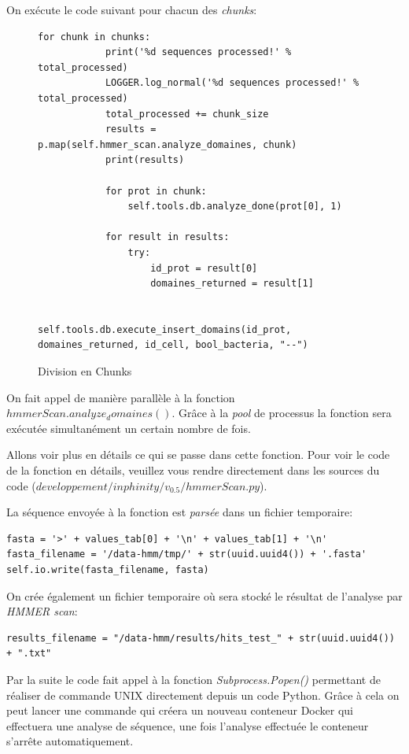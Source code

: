 On exécute le code suivant pour chacun des \emph{chunks}:

\begin{figure}[H] 
\centering 
\begin{lstlisting}[frame=single]
for chunk in chunks:
            print('%d sequences processed!' % total_processed)
            LOGGER.log_normal('%d sequences processed!' % total_processed)
            total_processed += chunk_size
            results = p.map(self.hmmer_scan.analyze_domaines, chunk)
            print(results)

            for prot in chunk:
                self.tools.db.analyze_done(prot[0], 1)

            for result in results:
                try:
                    id_prot = result[0]
                    domaines_returned = result[1]

                    self.tools.db.execute_insert_domains(id_prot, domaines_returned, id_cell, bool_bacteria, "--")
\end{lstlisting} 
\caption[Division en Chunks]{Division en Chunks}
\label{fig:chunks} 
\end{figure}

On fait appel de manière parallèle à la fonction \emph{$hmmerScan.analyze_domaines()$}. Grâce à la \emph{pool} de processus la fonction sera exécutée simultanément un certain nombre de fois.

Allons voir plus en détails ce qui se passe dans cette fonction. Pour voir le code de la fonction en détails, veuillez vous rendre directement dans les sources du code (\emph{$developpement/inphinity/v_0.5/hmmerScan.py$}).

La séquence envoyée à la fonction est \emph{parsée} dans un fichier temporaire:

\begin{lstlisting}[frame=single]
fasta = '>' + values_tab[0] + '\n' + values_tab[1] + '\n'
fasta_filename = '/data-hmm/tmp/' + str(uuid.uuid4()) + '.fasta'
self.io.write(fasta_filename, fasta)
\end{lstlisting} 

On crée également un fichier temporaire où sera stocké le résultat de l'analyse par \emph{HMMER scan}:

\begin{lstlisting}[frame=single]
results_filename = "/data-hmm/results/hits_test_" + str(uuid.uuid4()) + ".txt"
\end{lstlisting} 

Par la suite le code fait appel à la fonction \emph{Subprocess.Popen()} permettant de réaliser de commande UNIX directement depuis un code Python. Grâce à cela on peut lancer une commande qui créera un nouveau conteneur Docker qui effectuera une analyse de séquence, une fois l'analyse effectuée le conteneur s'arrête automatiquement.


